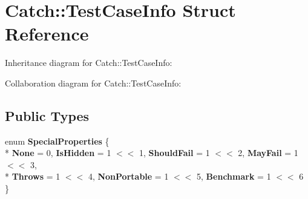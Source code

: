 \hypertarget{structCatch_1_1TestCaseInfo}{}\section{Catch\+:\+:Test\+Case\+Info Struct Reference}
\label{structCatch_1_1TestCaseInfo}


Inheritance diagram for Catch\+:\+:Test\+Case\+Info\+:


Collaboration diagram for Catch\+:\+:Test\+Case\+Info\+:
\subsection*{Public Types}
\begin{DoxyCompactItemize}
\item 
enum {\bfseries Special\+Properties} \{ \\*
{\bfseries None} = 0, 
{\bfseries Is\+Hidden} = 1 $<$$<$ 1, 
{\bfseries Should\+Fail} = 1 $<$$<$ 2, 
{\bfseries May\+Fail} = 1 $<$$<$ 3, 
\\*
{\bfseries Throws} = 1 $<$$<$ 4, 
{\bfseries Non\+Portable} = 1 $<$$<$ 5, 
{\bfseries Benchmark} = 1 $<$$<$ 6
 \}\hypertarget{structCatch_1_1TestCaseInfo_a39b232f74b4a7a6f2183b96759027eac}{}\label{structCatch_1_1TestCaseInfo_a39b232f74b4a7a6f2183b96759027eac}

\end{DoxyCompactItemize}
